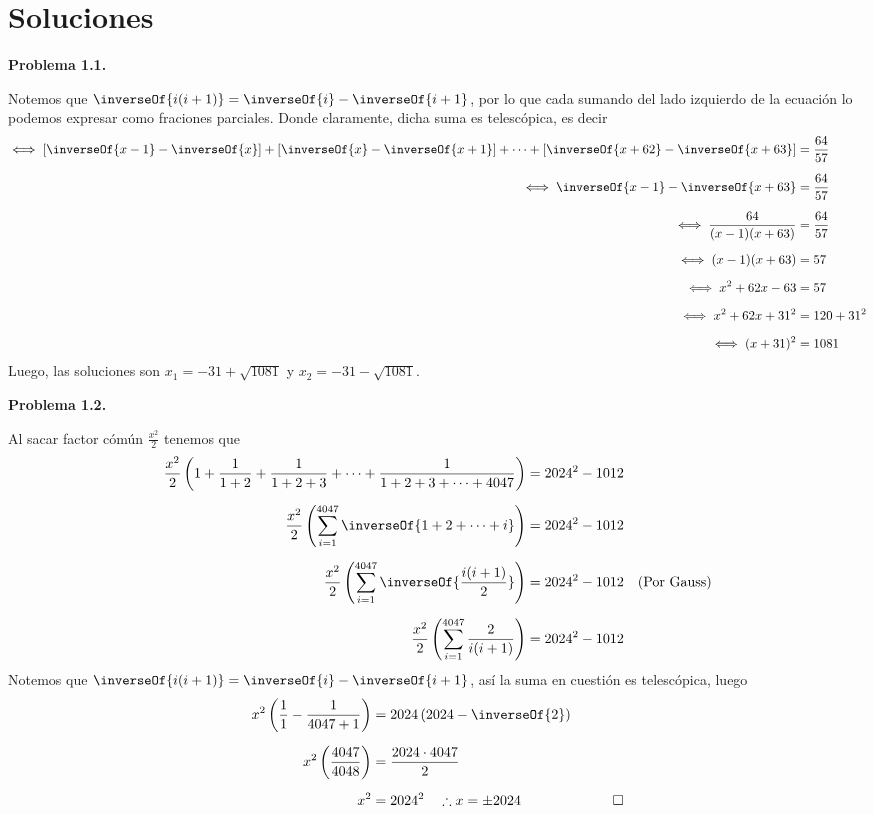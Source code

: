 \newpage
\section{\large Soluciones}

\textbf{Problema 1.1.}
\begin{solution}
    Notemos que $\inverseOf{i(i + 1)} = \inverseOf{i} - \inverseOf{i + 1}$, por lo que cada sumando del lado izquierdo de la ecuación lo podemos expresar como fraciones parciales.
    Donde claramente, dicha suma es telescópica, es decir
    \begin{align*}
        \iff \left[\inverseOf{x - 1} - \inverseOf{x}\right] + \left[ \inverseOf{x} - \inverseOf{x + 1}\right] + \cdots + \left[\inverseOf{x + 62} - \inverseOf{x + 63}\right] &= \frac{64}{57}\\[2mm]
        \iff \inverseOf{x - 1} - \inverseOf{x + 63} &= \frac{64}{57}\\[2mm]
        \iff \frac{64}{(x - 1)(x + 63)} &= \frac{64}{57}\\[2mm]
        \iff (x - 1)(x + 63) &= 57\\[2mm]
        \iff x^2 + 62x - 63 &= 57\\[2mm]
        \iff x^2 + 62x + 31^2 &= 120 + 31^2\\[2mm]
        \iff (x + 31)^2 &= 1081
    \end{align*}
    Luego, las soluciones son $x_1 = -31 + \sqrt {1081}$ y $x_2 = -31 - \sqrt {1081}$.
\end{solution}

\textbf{Problema 1.2.}
\begin{solution}
    Al sacar factor cómún $\frac{x^2}{2}$ tenemos que
    \begin{align*}
        \frac{x^2}{2}\left(1 + \frac{1}{1 + 2} + \frac{1}{1 + 2 + 3} + \cdots + \frac{1}{1 + 2 + 3 + \cdots + 4047}\right) &= 2024^2 - 1012 &&\\[2mm]
        \frac{x^2}{2}\left(\sum_{i = 1}^{4047} \inverseOf{1 + 2 + \cdots + i}\right) &= 2024^2 - 1012 &&\\[2mm]
        \frac{x^2}{2}\left(\sum_{i = 1}^{4047} \inverseOf{\frac{i(i + 1)}{2}}\right) &= 2024^2 - 1012 &&  (\text{Por Gauss})\\[2mm]
        \frac{x^2}{2}\left(\sum_{i = 1}^{4047} \frac{2}{i(i + 1)}\right) &= 2024^2 - 1012 &&
    \end{align*}
    Notemos que $\inverseOf{i(i + 1)} = \inverseOf{i} - \inverseOf{i + 1}$, así la suma en cuestión es telescópica, luego
    \begin{align*}
        x^2\left(\frac{1}{1} - \frac{1}{4047 + 1}\right) &= 2024\left(2024 - \inverseOf{2}\right) &&\\[2mm]
        x^2\left(\frac{4047}{4048}\right) &= \frac{2024 \cdot 4047}{2} &&\\[2mm]
        x^2 &= 2024^2 \quad \therefore x = \pm 2024&& \qedhere
    \end{align*}
\end{solution}

